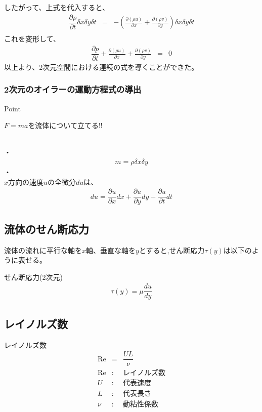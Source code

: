 \documentclass[a4paper]{jsarticle}
\begin{document}
したがって、上式を代入すると、
\begin{eqnarray*}
    \dfrac{\partial \rho}{\partial t}\delta x \delta y \delta t&=&-\left(\frac{\partial\left(\rho u\right)}{\partial x}+\frac{\partial\left(\rho v\right)}{\partial y}\right)\delta x \delta y \delta t\\
\end{eqnarray*}
これを変形して、
\begin{eqnarray*}
    \dfrac{\partial p}{\partial t}+\frac{\partial\left(\rho u\right)}{\partial x}+\frac{\partial\left(\rho v\right)}{\partial y}&=&0
\end{eqnarray*}
以上より、2次元空間における連続の式を導くことができた。
\subsubsection{2次元のオイラーの運動方程式の導出}
\begin{itembox}[l]{Point}
    \begin{center}
        \quad$F=ma$を流体について立てる!!
    \end{center}
\end{itembox}
\\
・\\
\begin{eqnarray*}
    m=\rho \delta x \delta y
\end{eqnarray*}
・\\
$x$方向の速度$u$の全微分$du$は、
\begin{eqnarray*}
    du=\dfrac{\partial u}{\partial x}dx+\dfrac{\partial u}{\partial y}dy+\dfrac{\partial u}{\partial t}dt
\end{eqnarray*}
\subsection{流体のせん断応力}
流体の流れに平行な軸を$x$軸、垂直な軸を$y$とすると,せん断応力$\tau\left(y\right)$は以下のように表せる。
\begin{itembox}[l]{せん断応力(2次元)}
    \begin{eqnarray*}
        \tau\left(y\right)=\mu\dfrac{du}{dy}
    \end{eqnarray*}
\end{itembox}
\subsection{レイノルズ数}
\begin{itembox}[l]{レイノルズ数}
    \begin{eqnarray*}
        \mathrm{Re}&=&\dfrac{UL}{\nu}\\
        \mathrm{Re} &:& レイノルズ数\\
        U &:& 代表速度\\
        L &:& 代表長さ\\
        \nu &:& 動粘性係数
    \end{eqnarray*}
\end{itembox}
\end{document}
